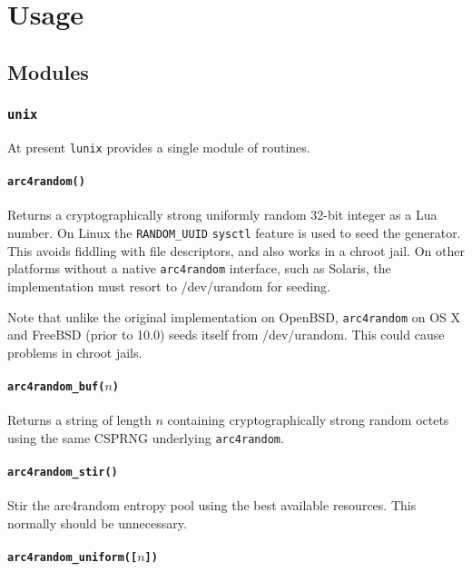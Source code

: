 \documentclass[11pt, oneside]{memoir}
\newcommand*{\lunix}[0]{\texttt{lunix}\xspace}
\newcommand*{\fn}[1]{\texttt{#1}\xspace}
\newcommand*{\const}[1]{\texttt{#1}\xspace}
\newcounter{toccols}
\newenvironment{Module}[1]{
	\subsection{\texttt{#1}}
	\addtocontents{toc}{
		\protect\begin{multicols}{\value{toccols}}
	}
}{
	\addtocontents{toc}{\protect\end{multicols}}
}
\begin{document}
\chapter{Usage}

\section{Modules}

\begin{Module}{unix}

At present \lunix provides a single module of routines.

\subsubsection[\fn{arc4random}]{\fn{arc4random()}}

Returns a cryptographically strong uniformly random 32-bit integer as a Lua number. On Linux the
\const{RANDOM\_UUID} \fn{sysctl} feature is used to seed the generator. This avoids fiddling with file descriptors, and also works in a chroot jail. On other platforms without a native \fn{arc4random} interface, such as Solaris, the implementation must resort to /dev/urandom for seeding.

Note that unlike the original implementation on OpenBSD, \fn{arc4random} on OS X and FreeBSD (prior to 10.0) seeds itself from /dev/urandom. This could cause problems in chroot jails.

\subsubsection[\fn{arc4random\_buf}]{\fn{arc4random\_buf($n$)}}

Returns a string of length $n$ containing cryptographically strong random octets using the same CSPRNG underlying \fn{arc4random}.

\subsubsection[\fn{arc4random\_stir}]{\fn{arc4random\_stir()}}

Stir the arc4random entropy pool using the best available resources. This normally should be unnecessary.

\subsubsection[\fn{arc4random\_uniform}]{\fn{arc4random\_uniform([$n$])}}


\end{Module}
\end{document}

